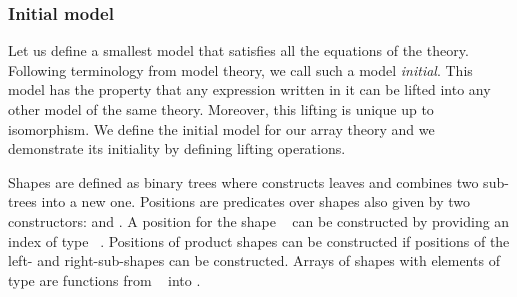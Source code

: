 \subsubsection{\label{sec:initial}Initial model}

Let us define a smallest model that satisfies all the equations of the theory.
Following terminology from model theory, we call such a model \emph{initial}.
This model has the property that any expression written in it can be lifted
into any other model of the same theory. Moreover, this lifting is unique up to
isomorphism. We define the initial model for our array theory and we
demonstrate its initiality by defining lifting operations.

Shapes are defined as binary trees where  constructs leaves and 
combines two sub-trees into a new one. Positions are predicates over shapes
also given by two constructors:  and . A position for the shape
\  can be constructed by providing an index of type \
. Positions of product shapes can be constructed if positions of the
left- and right-sub-shapes can be constructed. Arrays of shapes  with
elements of type  are functions from \AF{P}\ \AB{s} into \AB{X}.
